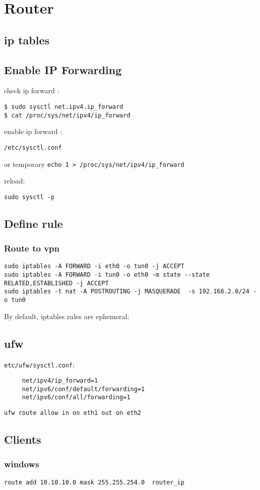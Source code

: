 \chapter{Router}

\section{ip tables}

\section{Enable IP Forwarding}
check ip forward :
\begin{verbatim}
$ sudo sysctl net.ipv4.ip_forward
$ cat /proc/sys/net/ipv4/ip_forward
\end{verbatim}


enable ip forward :

\begin{verbatim}
/etc/sysctl.conf
\end{verbatim}


or temporary \verb+echo 1 > /proc/sys/net/ipv4/ip_forward+

reload:
\begin{verbatim}
sudo sysctl -p
\end{verbatim}


\section{Define rule}

\subsection{Route to vpn}
\begin{verbatim}
sudo iptables -A FORWARD -i eth0 -o tun0 -j ACCEPT
sudo iptables -A FORWARD -i tun0 -o eth0 -m state --state RELATED,ESTABLISHED -j ACCEPT
sudo iptables -t nat -A POSTROUTING -j MASQUERADE  -s 192.168.2.0/24 -o tun0 
\end{verbatim}

By default, iptables rules are ephemeral:

\section{ufw}

\verb+etc/ufw/sysctl.conf+:
\begin{verbatim}
     net/ipv4/ip_forward=1
     net/ipv6/conf/default/forwarding=1
     net/ipv6/conf/all/forwarding=1
\end{verbatim}

\begin{verbatim}
ufw route allow in on eth1 out on eth2
\end{verbatim}


\section{Clients}
\subsection{windows}
\begin{verbatim}
route add 10.10.10.0 mask 255.255.254.0  router_ip
\end{verbatim}
